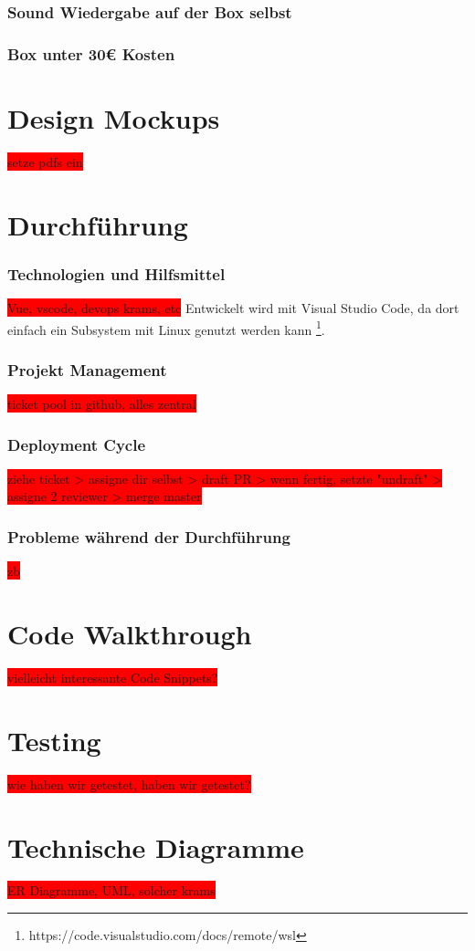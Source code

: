 \documentclass[10pt, a4paper, draft]{article}
\begin{document}
\subsubsection{Sound Wiedergabe auf der Box selbst}
\subsubsection{Box unter 30€ Kosten}

\section{Design Mockups}
\colorbox{red}{setze pdfs ein}

\section{Durchführung}
\subsubsection{Technologien und Hilfsmittel}
\colorbox{red}{Vue, vscode, devops krams, etc}
Entwickelt wird mit Visual Studio Code, da dort einfach ein Subsystem mit Linux genutzt werden kann \footnote{https://code.visualstudio.com/docs/remote/wsl}.

\subsubsection{Projekt Management}
\colorbox{red}{ticket pool in github, alles zentral}

\subsubsection{Deployment Cycle}
\colorbox{red}{ziehe ticket > assigne dir selbst > draft PR > wenn fertig, setzte "undraft" > assigne 2 reviewer > merge master}

\subsubsection{Probleme während der Durchführung}
\colorbox{red}{zb }
\section{Code Walkthrough}
\colorbox{red}{vielleicht interessante Code Snippets?}
\section{Testing}
\colorbox{red}{wie haben wir getestet, haben wir getestet?}
\section{Technische Diagramme}
\colorbox{red}{ER Diagramme, UML, solcher krams}
 
\end{document}
